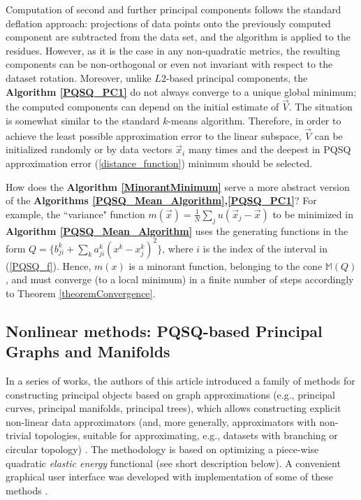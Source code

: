 \documentclass[preprint,12pt,twocolumn]{elsarticle}
\begin{document}
Computation of second and further principal components follows the standard deflation approach: projections of data points onto the previously computed component are subtracted from the data set, and the algorithm is applied to the residues. However, as it is the case in any non-quadratic metrics, the resulting components can be non-orthogonal or even not invariant with respect to the dataset rotation. Moreover, unlike $L2$-based principal components, the \textbf{Algorithm \ref{PQSQ_PC1}} do not always converge to a unique global minimum; the computed components can depend on the initial estimate of $\vec{V}$. The situation is somewhat similar to the standard $k$-means algorithm. Therefore, in order to achieve the least possible approximation error to the linear subspace, $\vec{V}$ can be initialized randomly or by data vectors $\vec{x}_i$ many times and the deepest in PQSQ approximation error (\ref{distance_function}) minimum should be selected.

How does the \textbf{Algorithm \ref{MinorantMinimum}} serve a more abstract version of the \textbf{Algorithms \ref{PQSQ_Mean_Algorithm},\ref{PQSQ_PC1}}? For example, the ``variance" function $m(\vec{x})=\frac{1}{N}\sum_j u(\vec{x}_j-\vec{x})$ to be minimized in \textbf{Algorithm \ref{PQSQ_Mean_Algorithm}} uses the generating functions in the form $Q = \{b_{ji}^k+\sum_k a_{ji}^k(x^k-x_j^k)^2\}$, where $i$ is the index of the interval in (\ref{PQSQ_f}). Hence, $m(x)$ is a minorant function, belonging to the cone $\mathbb{M}(Q)$, and must converge (to a local minimum) in a finite number of steps accordingly to Theorem \ref{theoremConvergence}.


\subsection{Nonlinear methods: PQSQ-based Principal Graphs and Manifolds}

In a series of works, the authors of this article introduced a family of methods
for constructing principal objects
based on graph approximations (e.g., principal curves, principal manifolds, principal trees),
which allows constructing explicit non-linear data approximators
(and, more generally, approximators with non-trivial topologies, suitable for approximating,
e.g., datasets with branching or circular topology) \cite{Gorban1999, Gorban2001ihespreprint, gorban2001method, gorban2005elastic, gorban2007topological,Gorban2008Principal,Gorban2009,Gorban2010}. The methodology is
based on optimizing a piece-wise quadratic {\it elastic energy} functional (see short description below).
A convenient graphical user interface was developed with
implementation of some of these methods \cite{Gorban2014}.
\end{document}
